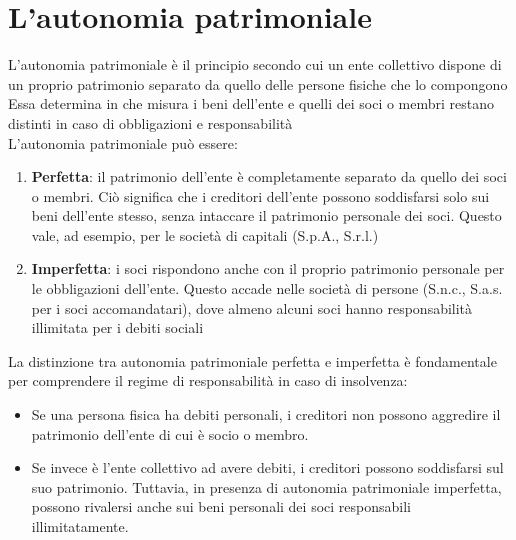 \documentclass[10pt,oneside,a4paper]{article}
\begin{document}
	\section{L'autonomia patrimoniale}
	L'autonomia patrimoniale è il principio secondo cui un ente collettivo dispone di un proprio patrimonio separato da quello delle persone fisiche che lo compongono\\
	Essa determina in che misura i beni dell'ente e quelli dei soci o membri restano distinti in caso di obbligazioni e responsabilità\\
	L'autonomia patrimoniale può essere:  
	\begin{enumerate}
		\item \textbf{Perfetta}: il patrimonio dell'ente è completamente separato da quello dei soci o membri. Ciò significa che i creditori dell'ente possono soddisfarsi solo sui beni dell'ente stesso, senza intaccare il patrimonio personale dei soci. Questo vale, ad esempio, per le società di capitali (S.p.A., S.r.l.)
		\item \textbf{Imperfetta}: i soci rispondono anche con il proprio patrimonio personale per le obbligazioni dell'ente. Questo accade nelle società di persone (S.n.c., S.a.s. per i soci accomandatari), dove almeno alcuni soci hanno responsabilità illimitata per i debiti sociali
	\end{enumerate}
	La distinzione tra autonomia patrimoniale perfetta e imperfetta è fondamentale per comprendere il regime di responsabilità in caso di insolvenza:  
	\begin{itemize}
		\item Se una persona fisica ha debiti personali, i creditori non possono aggredire il patrimonio dell'ente di cui è socio o membro.  
		\item Se invece è l'ente collettivo ad avere debiti, i creditori possono soddisfarsi sul suo patrimonio. Tuttavia, in presenza di autonomia patrimoniale imperfetta, possono rivalersi anche sui beni personali dei soci responsabili illimitatamente.  
	\end{itemize}
\end{document}
